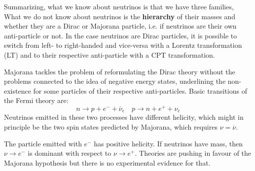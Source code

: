 \documentclass[10.75pt,a4paper,openright,bottom=2cm]{article}
\begin{document}
Summarizing, what we know about neutrinos is that we have three families, What we do not know about neutrinos is the \textbf{hierarchy} of their masses and whether they are a Dirac or Majorana particle, i.e. if neutrinos are their own anti-particle or not. In the case neutrinos are Dirac particles, it is possible to switch from left- to right-handed and vice-versa with a Lorentz transformation (LT) and to their respective anti-particle with a CPT transformation.
\begin{center}
\end{center}
Majorana tackles the problem of reformulating the Dirac theory without the problems connected to the idea of negative energy states, underlining the non-existence for some particles of their respective anti-particles. Basic transitions of the Fermi theory are:
\[
n\to p+e^-+\overline{\nu}_e \quad p\to n+e^++\nu_e
\]
Neutrinos emitted in these two processes have different helicity, which might in principle be the two spin states predicted by Majorana, which requires $\nu=\overline{\nu}$.
\begin{center}
\end{center}
The particle emitted with $e^-$ has positive helicity. If neutrinos have mass, then $\nu\to e^-$ is dominant with respect to $\nu\to e^+$. Theories are pushing in favour of the Majorana hypothesis but there is no experimental evidence for that.\\
\end{document}

